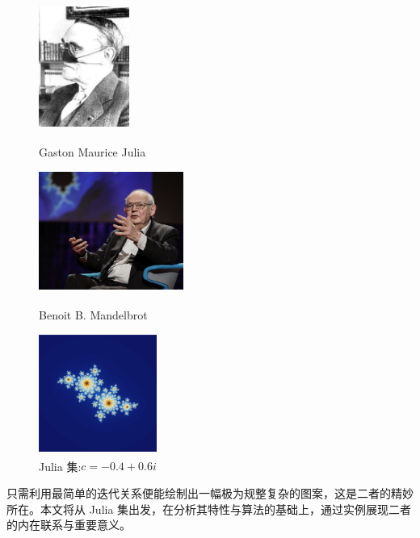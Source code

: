 \begin{figure}[htbp]
\centering
\begin{minipage}{0.3\linewidth}
\centering
\includegraphics[width = 2.97cm]{./images/julia.jpg}
\caption{Gaston Maurice Julia\textsuperscript{\cite{pic-julia}}}
\label{fig1-1}
\end{minipage}\hfill
\begin{minipage}{0.3\linewidth}
\centering
\includegraphics[width = 4.73cm]{./images/mandelbort.png}
\caption{Benoit B. Mandelbrot\textsuperscript{\cite{enwiki-mandelbort}}}
\label{fig1-2}
\end{minipage}\hfill
\begin{minipage}{0.35\linewidth}
\centering
\includegraphics[width = 3.85cm]{./images/julia_set_example.png}
\caption{Julia 集:$c=−0.4+0.6i$\textsuperscript{\cite{enwiki-juliaset}}}
\label{fig1-3}
\end{minipage}
\end{figure}

只需利用最简单的迭代关系便能绘制出一幅极为规整复杂的图案，这是二者的精妙所在。本文将从 Julia 集出发，在分析其特性与算法的基础上，通过实例展现二者的内在联系与重要意义。